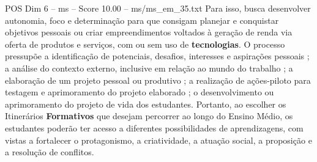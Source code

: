 \begin{textsample}{POS Dim 6 – ms – Score 10.00 – ms/ms\_em\_35.txt}
Para isso, busca desenvolver autonomia, foco e determinação para que consigam planejar e conquistar objetivos pessoais ou criar empreendimentos voltados à geração de renda via oferta de produtos e serviços, com ou sem uso de \textbf{tecnologias}.
O processo pressupõe a identificação de potenciais, desafios, interesses e aspirações pessoais ; a análise do contexto externo, inclusive em relação ao mundo do trabalho ; a elaboração de um projeto pessoal ou produtivo ; a realização de ações-piloto para testagem e aprimoramento do projeto elaborado ; o desenvolvimento ou aprimoramento do projeto de vida dos estudantes.
Portanto, ao escolher os Itinerários \textbf{Formativos} que desejam percorrer ao longo do Ensino Médio, os estudantes poderão ter acesso a diferentes possibilidades de aprendizagens, com vistas a fortalecer o protagonismo, a criatividade, a atuação social, a proposição e a resolução de conflitos.

\end{textsample}
